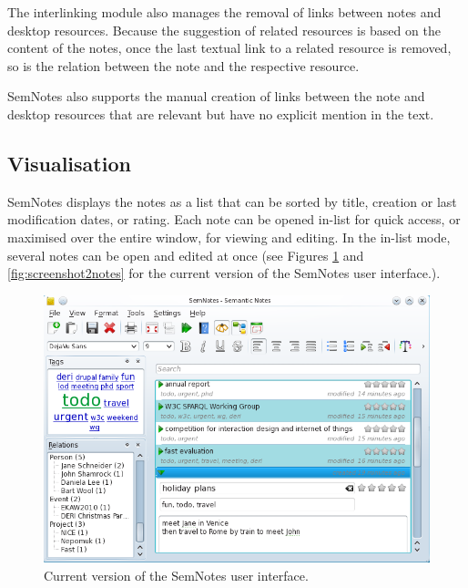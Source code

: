 The interlinking module also manages the removal of links between notes and desktop resources.
Because the suggestion of related resources is based on the content of the notes, once the last textual link to a related resource is removed, so is the relation between the note and the respective resource. 

SemNotes also supports the manual creation of links between the note and desktop resources that are relevant but have no explicit mention in the text.

\subsection{Visualisation}
\label{sub:semnotesvisualization}

SemNotes displays the notes as a list that can be sorted by title, creation or last modification dates, or rating. Each note can be opened in-list for quick access, or maximised over the entire window, for viewing and editing. In the in-list mode, several notes can be open and edited at once (see Figures \ref{fig:screenshot} and \ref{fig:screenshot2notes} for the current version of the SemNotes user interface.).

\begin{figure}[tb]
 \includegraphics[width=\linewidth]{chapters/core/img/semnotes-screenshot}
\caption{Current version of the SemNotes user interface.}
\label{fig:screenshot}
\end{figure} 

